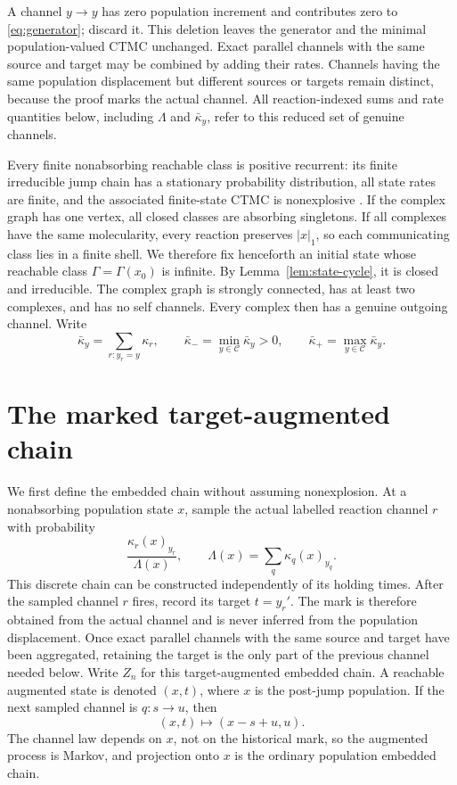 A channel \(y\to y\) has zero population increment and contributes zero to
\eqref{eq:generator}; discard it.  This deletion leaves the generator and the
minimal population-valued CTMC unchanged.  Exact parallel channels with the same
source and target may be combined by adding their rates.  Channels having the
same population displacement but different sources or targets remain
distinct, because the proof marks the actual channel.
All reaction-indexed sums and rate quantities below, including \(\Lambda\)
and \(\bar\kappa_y\), refer to this reduced set of genuine channels.

Every finite nonabsorbing reachable class is positive recurrent:
its finite irreducible jump chain has a stationary probability distribution,
all state rates are finite, and the associated finite-state CTMC is
nonexplosive \citep{Norris1997}.  If
the complex graph has one vertex, all closed classes are absorbing
singletons.  If all complexes have the same molecularity, every reaction
preserves \(|x|_1\), so each communicating class lies in a finite shell.  We
therefore fix henceforth an initial state whose reachable class
\(\Gamma=\Gamma(x_0)\) is infinite.  By
Lemma~\ref{lem:state-cycle}, it is closed and irreducible.  The complex graph
is strongly connected, has at least two complexes, and has no self channels.
Every complex then has a genuine outgoing channel.  Write
\begin{equation}\label{eq:kbar}
  \bar\kappa_y=\sum_{r:y_r=y}\kappa_r,
  \qquad
  \bar\kappa_- =\min_{y\in\mathcal C}\bar\kappa_y>0,
  \qquad
  \bar\kappa_+ =\max_{y\in\mathcal C}\bar\kappa_y.
\end{equation}

\section{The marked target-augmented chain}\label{sec:marked}

We first define the embedded chain without assuming nonexplosion.  At a
nonabsorbing population state \(x\), sample the actual labelled reaction
channel \(r\) with probability
\begin{equation}\label{eq:channel-kernel}
  \frac{\kappa_r(x)_{y_r}}{\Lambda(x)},
  \qquad
  \Lambda(x)=\sum_q\kappa_q(x)_{y_q}.
\end{equation}
This discrete chain can be constructed independently of its holding times.
After the sampled channel \(r\) fires, record its target \(t=y_r'\).  The mark
is therefore obtained from the actual channel and is never inferred from the
population displacement.  Once exact parallel channels with the same source
and target have been aggregated, retaining the target is the only part of the
previous channel needed below.  Write \(Z_n\) for this target-augmented
embedded chain.  A reachable augmented state is denoted \((x,t)\), where
\(x\) is the post-jump population.  If the next sampled
channel is \(q:s\to u\), then
\begin{equation}\label{eq:aug-transition}
  (x,t)\longmapsto(x-s+u,u).
\end{equation}
The channel law depends on \(x\), not on the historical mark, so the augmented
process is Markov, and projection onto \(x\) is the ordinary population
embedded chain.

